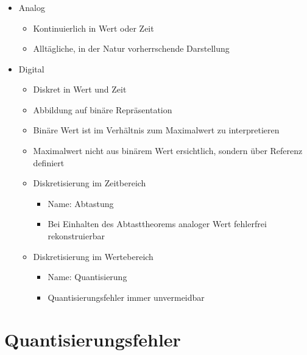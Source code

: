 \begin{frame}
    \frametitle{\insertsection}
    \begin{itemize}
        \item Analog
        \begin{itemize}
            \item Kontinuierlich in Wert oder Zeit
            \item Alltägliche, in der Natur vorherrschende Darstellung
        \end{itemize}
        \item Digital 
        \begin{itemize}
            \item Diskret in Wert und Zeit
            \item Abbildung auf binäre Repräsentation
            \item Binäre Wert ist im Verhältnis zum Maximalwert zu interpretieren
            \item Maximalwert nicht aus binärem Wert ersichtlich, sondern über Referenz definiert
            \item Diskretisierung im Zeitbereich
            \begin{itemize}
                \item Name: Abtastung
                \item Bei Einhalten des Abtasttheorems analoger Wert fehlerfrei rekonstruierbar
            \end{itemize}
            \item Diskretisierung im Wertebereich
            \begin{itemize}
                \item Name: Quantisierung
                \item Quantisierungsfehler immer unvermeidbar
            \end{itemize}
        \end{itemize}
    \end{itemize}
\end{frame}

\section{Quantisierungsfehler}


